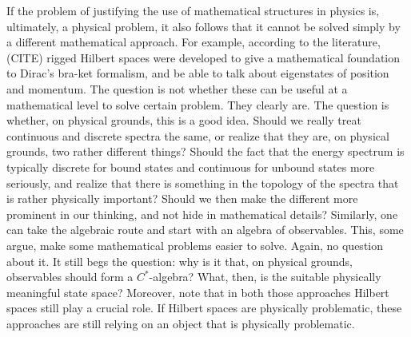 \documentclass[10pt,twocolumn, nofootinbib]{revtex4-2}
\begin{document}
If the problem of justifying the use of mathematical structures in physics is, ultimately, a physical problem, it also follows that it cannot be solved simply by a different mathematical approach. For example, according to the literature, (CITE) rigged Hilbert spaces were developed to give a mathematical foundation to Dirac’s bra-ket formalism, and be able to talk about eigenstates of position and momentum. The question is not whether these can be useful at a mathematical level to solve certain problem. They clearly are. The question is whether, on physical grounds, this is a good idea. Should we really treat continuous and discrete spectra the same, or realize that they are, on physical grounds, two rather different things? Should the fact that the energy spectrum is typically discrete for bound states and continuous for unbound states more seriously, and realize that there is something in the topology of the spectra that is rather physically important? Should we then make the different more prominent in our thinking, and not hide in mathematical details? Similarly, one can take the algebraic route and start with an algebra of observables. This, some argue, make some mathematical problems easier to solve. Again, no question about it. It still begs the question: why is it that, on physical grounds, observables should form a $C^*$-algebra? What, then, is the suitable physically meaningful state space? Moreover, note that in both those approaches Hilbert spaces still play a crucial role. If Hilbert spaces are physically problematic, these approaches are still relying on an object that is physically problematic.
\end{document}
